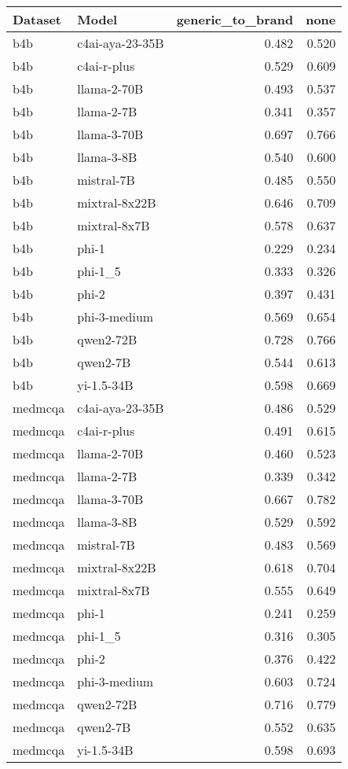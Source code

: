\begin{tabular}{llrr}
\toprule
Dataset & Model & generic_to_brand & none \\
\midrule
b4b & c4ai-aya-23-35B & 0.482 & 0.520 \\
b4b & c4ai-r-plus & 0.529 & 0.609 \\
b4b & llama-2-70B & 0.493 & 0.537 \\
b4b & llama-2-7B & 0.341 & 0.357 \\
b4b & llama-3-70B & 0.697 & 0.766 \\
b4b & llama-3-8B & 0.540 & 0.600 \\
b4b & mistral-7B & 0.485 & 0.550 \\
b4b & mixtral-8x22B & 0.646 & 0.709 \\
b4b & mixtral-8x7B & 0.578 & 0.637 \\
b4b & phi-1 & 0.229 & 0.234 \\
b4b & phi-1_5 & 0.333 & 0.326 \\
b4b & phi-2 & 0.397 & 0.431 \\
b4b & phi-3-medium & 0.569 & 0.654 \\
b4b & qwen2-72B & 0.728 & 0.766 \\
b4b & qwen2-7B & 0.544 & 0.613 \\
b4b & yi-1.5-34B & 0.598 & 0.669 \\
medmcqa & c4ai-aya-23-35B & 0.486 & 0.529 \\
medmcqa & c4ai-r-plus & 0.491 & 0.615 \\
medmcqa & llama-2-70B & 0.460 & 0.523 \\
medmcqa & llama-2-7B & 0.339 & 0.342 \\
medmcqa & llama-3-70B & 0.667 & 0.782 \\
medmcqa & llama-3-8B & 0.529 & 0.592 \\
medmcqa & mistral-7B & 0.483 & 0.569 \\
medmcqa & mixtral-8x22B & 0.618 & 0.704 \\
medmcqa & mixtral-8x7B & 0.555 & 0.649 \\
medmcqa & phi-1 & 0.241 & 0.259 \\
medmcqa & phi-1_5 & 0.316 & 0.305 \\
medmcqa & phi-2 & 0.376 & 0.422 \\
medmcqa & phi-3-medium & 0.603 & 0.724 \\
medmcqa & qwen2-72B & 0.716 & 0.779 \\
medmcqa & qwen2-7B & 0.552 & 0.635 \\
medmcqa & yi-1.5-34B & 0.598 & 0.693 \\

\end{tabular}
